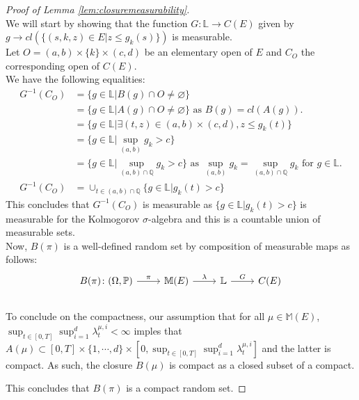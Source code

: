 \documentclass{article} %
\newcommand{\1}{\mathbbm{1}} %
\begin{document}
\begin{as}
\closuremeasurability*

\begin{proof}[Proof of Lemma \ref{lem:closuremeasurability}]
    \leavevmode \\
    We will start by showing that the function $G: \mathbb{L} \to C(E)$ given by $g \to cl(\{ (s,k,z) \in E | z \leq g_k(s)\})$ is measurable.\\
    Let $O = (a,b) \times \{k\} \times (c,d)$ be an elementary open of $E$ and $C_O$ the corresponding open of $C(E)$.\\
    We have the following equalities:
    \begin{align*}
        G^{-1}(C_O) &= \{ g \in \mathbb{L}| B(g) \cap O \neq \varnothing \} \\
        &= \{ g \in \mathbb{L}|A(g) \cap O \neq \varnothing \} \text{ as } B(g) = cl(A(g)). \\
        &= \{ g \in \mathbb{L}| \exists (t,z) \in (a,b) \times (c,d), z \leq g_k(t) \} \\
        &= \{ g \in \mathbb{L} | \sup_{(a,b)} g_k > c\} \\
        &= \{ g \in \mathbb{L} | \sup_{(a,b) \cap \mathbb{Q}} g_k > c \} \text{ as } \sup_{(a,b)} g_k = \sup_{(a,b) \cap \mathbb{Q}} g_k \text{ for } g \in \mathbb{L}.\\
        G^{-1}(C_O)&= \cup_{t \in (a,b) \cap \mathbb{Q}} \{ g \in \mathbb{L} | g_k(t) > c \}
    \end{align*}
    This concludes that $G^{-1}(C_O)$ is measurable as $\{ g \in \mathbb{L} | g_k(t) > c \}$ is measurable for the Kolmogorov $\sigma$-algebra and this is a countable union of measurable sets.\\
    Now, $B(\pi)$ is a well-defined random set by composition of measurable maps as follows:
    \[
    \begin{tikzcd}
    B(\pi) \colon (\Omega, \mathbb{P}) \arrow[r, "\pi"] & \mathbb{M}(E) \arrow[r, "\lambda"] & \mathbb{L} \arrow[r, "G"] & C(E)
    \end{tikzcd}
    \]\\
    To conclude on the compactness, our assumption that  for all $\mu \in \mathbb{M}(E)$, $\sup_{t \in [0,T]} \sup_{i=1}^d \lambda^{\mu, i}_t < \infty$ imples that $A(\mu) \subset [0,T] \times \{1,\cdots,d\} \times [0, \sup_{t \in [0,T]} \sup_{i=1}^d \lambda^{\mu, i}_t]$ and the latter is compact. As such, the closure $B(\mu)$ is compact as a closed subset of a compact.

    This concludes that $B(\pi)$ is a compact random set.
\end{proof}


\end{as}
\end{document}
